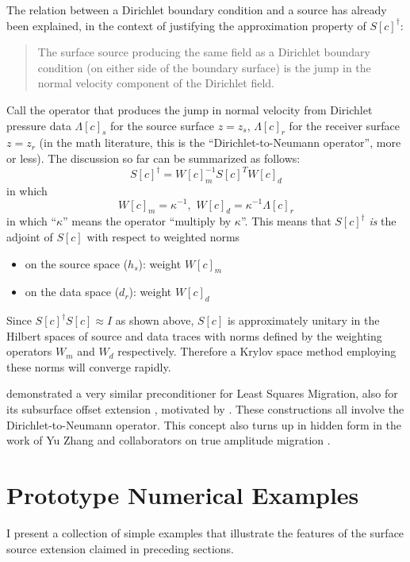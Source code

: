 The relation between a Dirichlet boundary condition and a source has already been explained, in the context of justifying the approximation property of $S[c]^{\dagger}$:
\begin{quote}
The surface source producing the same field as a Dirichlet boundary condition (on either side of the boundary surface) is the jump in the normal velocity component of the Dirichlet field. 
\end{quote}
Call the operator that produces the jump in normal velocity from Dirichlet pressure data $\Lambda[c]_s$ for the source surface $z=z_s$, $\Lambda[c]_r$ for the receiver surface $z=z_r$ (in the math literature, this is the ``Dirichlet-to-Neumann operator'', more or less). The discussion so far can be summarized as follows:
\begin{equation}
\label{eqn:wadj}
S[c]^{\dagger} = W[c]_m^{-1}S[c]^TW[c]_d 
\end{equation}
in which 
\begin{equation}
\label{eqn:weights}
W[c]_m = \kappa^{-1},\,\, W[c]_d = \kappa^{-1}\Lambda[c]_r
\end{equation}
in which ``$\kappa$'' means the operator ``multiply by $\kappa$''. This means that $S[c]^{\dagger}$ {\em is} the adjoint of $S[c]$ with respect to weighted norms 
\begin{itemize}
\item on the source space ($h_s$): weight $W[c]_m$
\item on the data space ($d_r$): weight $W[c]_d$
\end{itemize}
Since $S[c]^{\dagger}S[c] \approx I$ as shown above, $S[c]$ is approximately unitary in the Hilbert spaces of source and data traces with norms defined by the weighting operators $W_m$ and $W_d$ respectively. Therefore a Krylov space method employing these norms will converge rapidly.

\cite{HouSymes:EAGE16} demonstrated a very similar preconditioner for Least Squares Migration, also for its subsurface offset extension \cite[]{HouSymes:16}, motivated by \cite{tenKroode:12}. These constructions all involve the Dirichlet-to-Neumann operator. This concept also turns up in hidden form in the work of Yu Zhang and collaborators on true amplitude migration \cite[]{YuZhang:14,TangXuZhang:13,XuWang:2012,XuZhangTang:11,Zhang:SEG09,ZhangYuSun:08,ZhangSunGray:07,ZhangBleistein:05,Bleisteinetal:05}.

\section{Prototype Numerical Examples}
I present a collection of simple examples that illustrate the features of the surface source extension claimed in preceding sections. 

